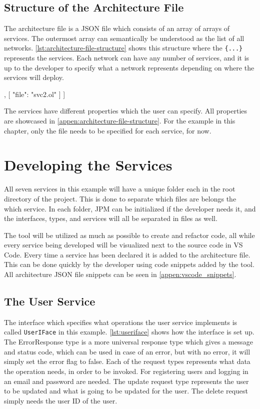 \subsection{Structure of the Architecture File}
The architecture file is a JSON file which consists of an array of arrays of services. The outermost array can semantically be understood as the list of all networks.
\cref{lst:architecture-file-structure} shows this structure where the \texttt{\{...\}} represents the services. Each network can have any number of services, and it is up to the
developer to specify what a network represents depending on where the services will deploy.

\begin{jsonlisting}[][caption={Structure of the architecture JSON file showing two networks.}, label=lst:architecture-file-structure]
[
    [
        { "file": "svc1.ol" }
    ],
    [
        { "file": "svc2.ol" }
    ]
]
\end{jsonlisting}

The services have different properties which the user can specify. All properties are showcased in \cref{appen:architecture-file-structure}.
For the example in this chapter, only the file needs to be specified for each service, for now.

\section{Developing the Services}
All seven services in this example will have a unique folder each in the root directory of the project. This is done to separate which files are belongs the which service.
In each folder, JPM can be initialized if the developer needs it, and the interfaces, types, and services will all be separated in files as well.

The tool will be utilized as much as possible to create and refactor code, all while every service being developed will be visualized next to the source code in VS Code.
Every time a service has been declared it is added to the architecture file. This can be done quickly by the developer using code snippets added by the tool. All architecture JSON file snippets can be seen in \cref{appen:vscode_snippets}.
\subsection{The User Service}
The interface which specifies what operations the user service implements is called \texttt{UserIFace} in this example.
\cref{lst:useriface} shows how the interface is set up. The ErrorResponse type is a more universal response type which gives a message and status code, which can be used in case of an error, but with no error, it will simply set the error flag to false.
Each of the request types represents what data the operation needs, in order to be invoked. For registering users and logging in an email and password are needed. The update request type represents the user to be updated and what is going to be updated for the user. The delete request simply needs the user ID of the user.

